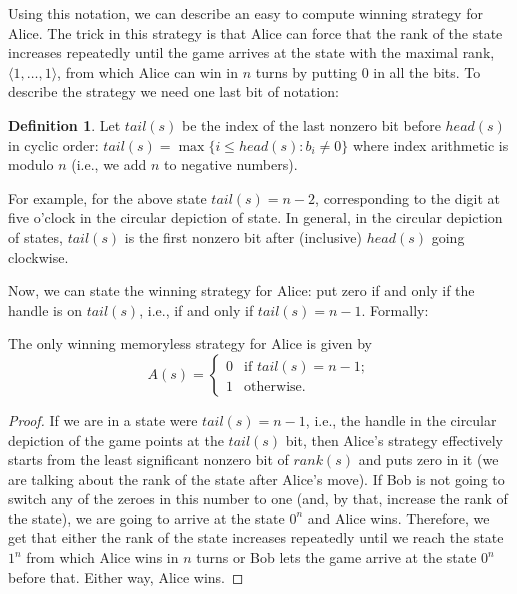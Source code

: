 \documentclass[final,12pt]{elsarticle}
\theoremstyle{definition} \newtheorem{definition}[theorem]{Definition} \newtheorem{observation}[theorem]{Observation} \newtheorem{example}[theorem]{Example} \newtheorem{remark}[theorem]{Remark} \newtheorem{corrolary}[theorem]{Corrolary}
\newcommand{\T}[1]{\langle{#1}\rangle} \DeclareMathOperator{\drop}{drop} \DeclareMathOperator{\dropbits}{drop\_bits} \DeclareMathOperator{\dropstates}{drop\_states} \DeclareMathOperator{\leadingForm}{LeadingForm} \DeclareMathOperator{\dv}{div} %
\begin{document}
Using this notation, we can describe an easy to compute winning strategy for Alice.  The trick in this strategy is that Alice can force that the rank of the state increases repeatedly until the game arrives at the state with the maximal  rank, $\T{1,\dots,1}$, from which Alice can win in $n$ turns by putting $0$ in all the bits. To describe the strategy we need one last bit of notation:

\begin{definition}
	Let $tail(s)$ be the index of the last nonzero bit before $head(s)$ in cyclic order:
	$tail(s) = \max \{ i \leq head(s) \colon b_i \neq 0 \}$ where index arithmetic is modulo $n$ (i.e., we add $n$ to negative numbers).
\end{definition}

For example, for the above state $tail(s)=n-2$, corresponding to the digit at five o'clock in the circular depiction of state. In general, in the circular depiction of states, $tail(s)$ is the first nonzero bit after (inclusive) $head(s)$ going clockwise.

Now, we can state the winning strategy for Alice: put zero if and only if the handle is on $tail(s)$, i.e., if and only if $tail(s)=n-1$. Formally:

\begin{proposition}
	The only winning memoryless strategy for Alice is given by  $$A(s) =
		\begin{cases}
			0 &
			\text{if } tail(s)=n-1; \\
			1 &
			\text{otherwise.}
		\end{cases} $$
		\label{prop:alice-eff-comp-strategy}
\end{proposition}
\begin{proof}
	If we are in a state were $tail(s)=n-1$, i.e., the handle in the circular depiction of the game points at the $tail(s)$ bit, then Alice's strategy effectively starts from the least significant nonzero bit of $rank(s)$ and puts zero in it (we are talking about the rank of the state after Alice's move). If Bob is not going to switch any of the zeroes in this number to one (and, by that, increase the rank of the state), we are going to arrive at the state $0^n$ and Alice wins. Therefore, we get that either the rank of the state increases repeatedly until we reach the state $1^n$ from which Alice wins in $n$ turns or Bob lets the game arrive at the state $0^n$ before that. Either way, Alice wins. 
\end{proof}
\end{document}
